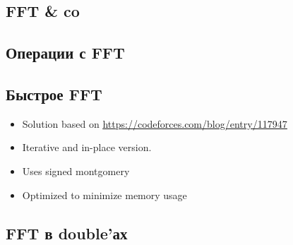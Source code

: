 \subsection{FFT \& co}


\subsection{Операции с FFT}

\subsection{Быстрое FFT}
\begin{itemize}
    \item Solution based on \underline{\url{https://codeforces.com/blog/entry/117947}}
    \item Iterative and in-place version.
    \item Uses signed montgomery
    \item Optimized to minimize memory usage
\end{itemize}

\subsection{FFT в double'ах}

